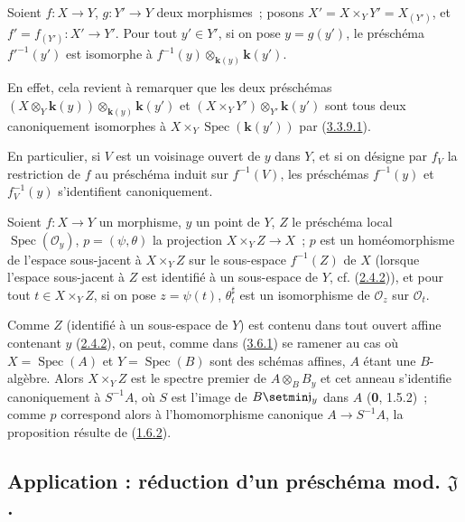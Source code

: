 \begin{proposition}
\label{I.3.6.4-fr}
Soient $f:X\to Y$, $g:Y'\to Y$ deux morphismes~; posons
$X'=X\times_Y Y'=X_{(Y')}$, et
$f'=f_{(Y')}:X'\to Y'$. Pour tout $y'\in Y'$, si on pose $y=g(y')$, le
préschéma $f'^{-1}(y')$ est isomorphe à
$f^{-1}(y)\otimes_{\boldsymbol{k}(y)}\boldsymbol{k}(y')$.
\end{proposition}

En effet, cela revient à remarquer que les deux préschémas
$(X\otimes_Y \boldsymbol{k}(y))\otimes_{\boldsymbol{k}(y)}\boldsymbol{k}(y')$ et
$(X\times_Y Y')\otimes_{Y'}\boldsymbol{k}(y')$ sont tous deux canoniquement isomorphes à
$X\times_Y\operatorname{Spec}(\boldsymbol{k}(y'))$ par
(\hyperref[I.3.3.9.1-fr]{3.3.9.1}).

En particulier, si $V$ est un voisinage ouvert de $y$ dans $Y$, et si on
désigne par $f_V$ la restriction de $f$ au préschéma induit sur $f^{-1}(V)$,
les préschémas $f^{-1}(y)$ et $f_V^{-1}(y)$ s'identifient canoniquement.

\begin{proposition}[3.6.5]
\label{I.3.6.5-fr}
Soient $f:X\to Y$ un morphisme, $y$ un point de $Y$, $Z$ le préschéma local
$\operatorname{Spec}(\mathcal{O}_y)$, $p=(\psi,\theta)$ la projection
$X\times_Y Z\to X$~; $p$ est un homéomorphisme de l'espace sous-jacent à
$X\times_Y Z$ sur le sous-espace $f^{-1}(Z)$ de $X$ \textup{(lorsque l'espace
sous-jacent à $Z$ est identifié à un sous-espace de $Y$, cf.
(\hyperref[I.2.4.2-fr]{2.4.2}))}, et pour tout $t\in X\times_Y Z$, si on pose
$z=\psi(t)$, $\theta_t^\sharp$ est un isomorphisme de $\mathcal{O}_z$ sur
$\mathcal{O}_t$.
\end{proposition}

Comme $Z$ (identifié à un sous-espace de $Y$) est contenu dans tout ouvert
affine contenant $y$ (\hyperref[I.2.4.2-fr]{2.4.2}), on peut, comme dans
(\hyperref[I.3.6.1-fr]{3.6.1}) se ramener au cas où
$X=\operatorname{Spec}(A)$ et $Y=\operatorname{Spec}(B)$ sont des schémas
affines, $A$ étant une $B$-algèbre. Alors $X\times_Y Z$ est le spectre premier
de $A\otimes_B B_y$ et cet anneau s'identifie canoniquement à $S^{-1}A$, où
$S$ est l'image de $B\setmin\mathfrak{j}_y$ dans $A$ (\textbf{0}, 1.5.2)~; comme $p$
correspond alors à l'homomorphisme canonique $A\to S^{-1}A$, la proposition
résulte de (\hyperref[I.1.6.2-fr]{1.6.2}).

\subsection{Application : réduction d'un préschéma mod.
\texorpdfstring{$\mathfrak{J}$\protect\footnotemark}{J}.}
\label{subsection:I.3.7-fr}
\label{I.3.7-fr}

